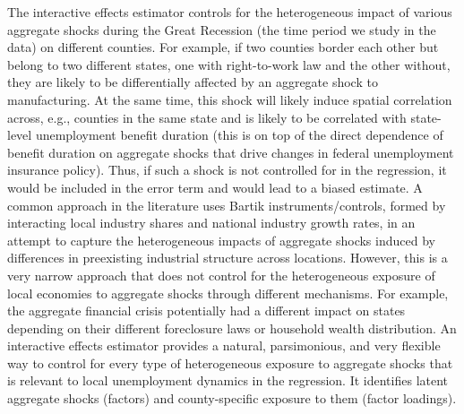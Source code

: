 \documentclass[12pt]{article}
\newcommand{\1}{\mathbf{1}}
\begin{document}
The interactive effects estimator \citep{bai:09} controls for the heterogeneous impact of various aggregate shocks during the Great Recession (the time period we study in the data) on different counties. For example, if two counties border each other but belong to two different states, one with right-to-work law and the other without, they are likely to be differentially affected by an aggregate shock to manufacturing. At the same time, this shock will likely induce spatial correlation across, e.g., counties in the same state and is likely to be correlated with state-level unemployment benefit duration (this is on top of the direct dependence of benefit duration on aggregate shocks that drive changes in federal unemployment insurance policy). Thus, if such a shock is not controlled for in the regression, it would be included in the error term and would lead to a biased estimate. A common approach in the literature uses Bartik instruments/controls, formed by interacting local industry shares and national industry growth rates, in an attempt to capture the heterogeneous impacts of aggregate shocks induced by differences in preexisting industrial structure across locations. However, this is a very narrow approach that does not control for the heterogeneous exposure of local economies to aggregate shocks through different mechanisms. For example, the aggregate financial crisis potentially had a different impact on states depending on their different foreclosure laws or household wealth distribution. An interactive effects estimator provides a natural, parsimonious, and very flexible way to control for every type of heterogeneous exposure to aggregate shocks that is relevant to local unemployment dynamics in the regression. It identifies latent aggregate shocks (factors) and county-specific exposure to them (factor loadings).
\end{document}
